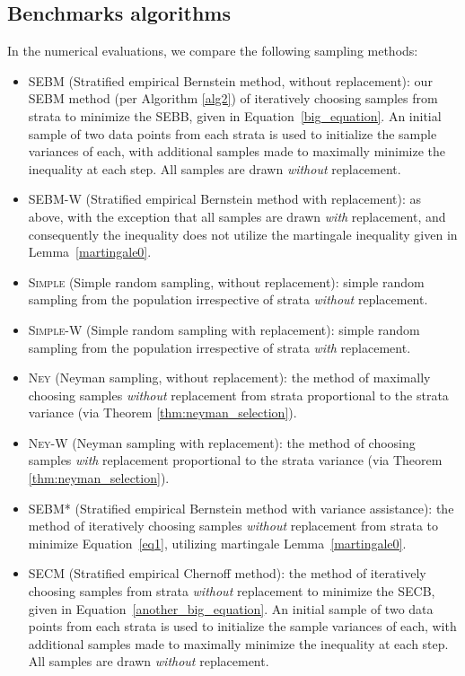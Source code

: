 \subsection{Benchmarks algorithms}
In the numerical evaluations, we compare the following sampling methods:
\begin{itemize}
\item 
\textsc{SEBM} (Stratified empirical Bernstein method, without replacement):
our SEBM method (per Algorithm \ref{alg2}) of iteratively choosing samples from strata to minimize the SEBB, given in Equation~\eqref{big_equation}. 
An initial sample of two data points from each strata is used to initialize the sample variances of each, with additional samples made to maximally minimize the inequality at each step. All samples are drawn \textit{without} replacement.
\item 
\textsc{SEBM-W} (Stratified empirical Bernstein method with replacement): 
as above, with the exception that all samples are drawn \textit{with} replacement, and consequently the inequality does not utilize the martingale inequality given in Lemma~\ref{martingale0}.
\item 
\textsc{Simple} (Simple random sampling, without replacement): simple random sampling from the population irrespective of strata \textit{without} replacement.
\item 
\textsc{Simple-W} (Simple random sampling with replacement): 
simple random sampling from the population irrespective of strata \textit{with} replacement.
\item \textsc{Ney} (Neyman sampling, without replacement): the method of maximally choosing samples \textit{without} replacement from strata proportional to the strata variance (via Theorem \ref{thm:neyman_selection}).
\item \textsc{Ney-W} (Neyman sampling with replacement): the method of choosing samples \textit{with} replacement proportional to the strata variance (via Theorem \ref{thm:neyman_selection}).
\item \textsc{SEBM*} (Stratified empirical Bernstein method with variance assistance): the method of iteratively choosing samples \textit{without} replacement from strata to minimize Equation~\eqref{eq1}, utilizing martingale Lemma~\ref{martingale0}.
\item \textsc{SECM} (Stratified empirical Chernoff method): the method of iteratively choosing samples from strata \textit{without} replacement to minimize the SECB, given in Equation~\eqref{another_big_equation}. 
An initial sample of two data points from each strata is used to initialize the sample variances of each, with additional samples made to maximally minimize the inequality at each step. All samples are drawn \textit{without} replacement.

\end{itemize}
